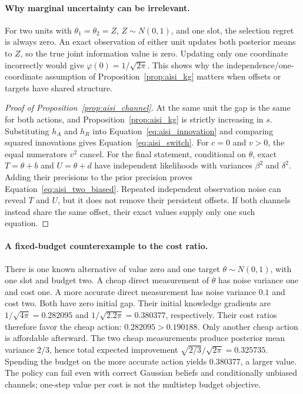 \paragraph{Why marginal uncertainty can be irrelevant.}
For two units with $\theta_1=\theta_2=Z$, $Z\sim N(0,1)$, and one slot,
the selection regret is always zero. An exact observation of either unit
updates both posterior means to $Z$, so the true joint information value
is zero. Updating only one coordinate incorrectly would give
$\varphi(0)=1/\sqrt{2\pi}$. This shows why the independence/one-coordinate
assumption of Proposition~\ref{prop:aisi_kg} matters when offsets or targets
have shared structure.

\begin{proof}[Proof of Proposition~\ref{prop:aisi_channel}]
At the same unit the gap is the same for both actions, and
Proposition~\ref{prop:aisi_kg} is strictly increasing in $s$.
Substituting $h_A$ and $h_R$ into Equation~\eqref{eq:aisi_innovation}
and comparing squared innovations gives Equation~\eqref{eq:aisi_switch}.
For $c=0$ and $v>0$, the equal numerators $v^2$ cancel.
For the final statement, conditional on $\theta$, exact $T=\theta+b$
and $U=\theta+d$ have independent likelihoods with variances $\beta^2$
and $\delta^2$. Adding their precisions to the prior precision proves
Equation~\eqref{eq:aisi_two_biased}. Repeated independent observation
noise can reveal $T$ and $U$, but it does not remove their persistent
offsets. If both channels instead share the same offset, their exact
values supply only one such equation.
\end{proof}

\paragraph{A fixed-budget counterexample to the cost ratio.}
There is one known alternative of value zero and one target
$\theta\sim N(0,1)$, with one slot and budget two. A cheap direct
measurement of $\theta$ has noise variance one and cost one. A more
accurate direct measurement has noise variance $0.1$ and cost two.
Both have zero initial gap. Their initial knowledge gradients are
$1/\sqrt{4\pi}=0.282095$ and
$1/\sqrt{2.2\pi}=0.380377$, respectively. Their cost ratios therefore
favor the cheap action: $0.282095>0.190188$. Only another cheap action
is affordable afterward. The two cheap measurements produce posterior
mean variance $2/3$, hence total expected improvement
$\sqrt{2/3}/\sqrt{2\pi}=0.325735$. Spending the budget on the more
accurate action yields $0.380377$, a larger value. The policy can fail
even with correct Gaussian beliefs and conditionally unbiased channels;
one-step value per cost is not the multistep budget objective.
